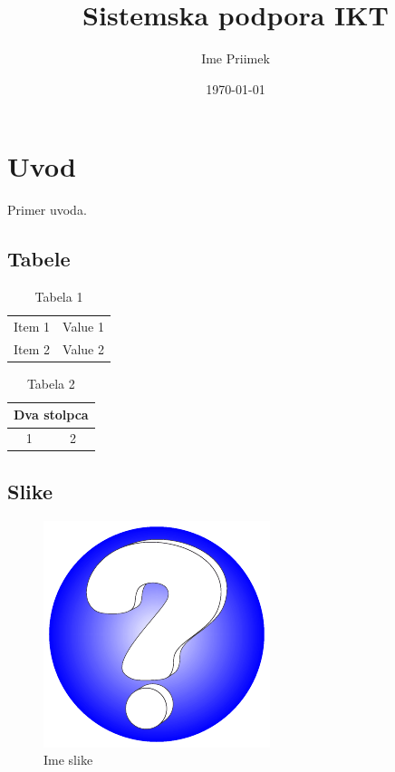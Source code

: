 \documentclass[a4paper,12pt]{article}
\title{Sistemska podpora IKT}
\date{\today}
\author{Ime Priimek}
\begin{document}
\maketitle
 
\newpage

\section{Uvod}  
Primer uvoda.

\subsection{Tabele}

\begin{table}[htb]
\centering
\begin{tabular}{|c|c|}
  \hline
  Item 1 & Value 1 \\
  Item 2 & Value 2 \\
  \hline
\end{tabular}
  \caption{Tabela 1}
\end{table}

\begin{table}[htb]
\centering
\begin{tabular}{|c|c|}
\hline
\multicolumn{2}{|c|}{Dva stolpca} \\
\hline
1 & 2 \\
\hline
\end{tabular}
\caption{Tabela 2}
\end{table}

\subsection{Slike}

\begin{figure}[htb]                
\centering
\includegraphics{vprasaj.pdf}
\caption{Ime slike}
\end{figure}
\end{document}
